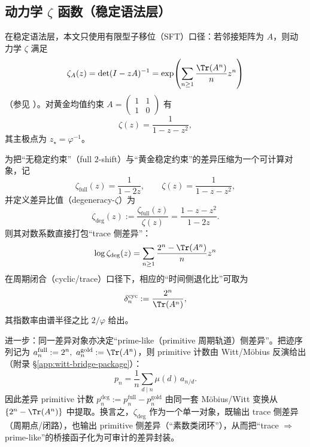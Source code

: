 \subsection{动力学 \texorpdfstring{$\zeta$}{zeta} 函数（稳定语法层）}

在稳定语法层，本文只使用有限型子移位（SFT）口径：若邻接矩阵为 $A$，则动力学 $\zeta$ 满足
\[
\zeta_A(z)=\det(I-zA)^{-1}
=\exp\!\left(\sum_{n\ge 1}\frac{\Tr(A^n)}{n}z^n\right)
\]
（参见 \cite{LindMarcus1995}）。对黄金均值约束
\(
A=\begin{pmatrix}1&1\\1&0\end{pmatrix}
\)
有
\[
\zeta(z)=\frac{1}{1-z-z^2},
\]
其主极点为 $z_\star=\varphi^{-1}$。

\begin{remark}\label{rem:degeneracy-zeta-bridge}
为把“无稳定约束”（full $2$-shift）与“黄金稳定约束”的差异压缩为一个可计算对象，记
\[
\zeta_{\mathrm{full}}(z)=\frac{1}{1-2z},
\qquad
\zeta(z)=\frac{1}{1-z-z^2},
\]
并定义差异比值（degeneracy-$\zeta$）为
\[
\zeta_{\mathrm{deg}}(z):=\frac{\zeta_{\mathrm{full}}(z)}{\zeta(z)}
=\frac{1-z-z^2}{1-2z}.
\]
则其对数系数直接打包“trace 侧差异”：
\[
\log \zeta_{\mathrm{deg}}(z)
=\sum_{n\ge 1}\frac{2^n-\Tr(A^n)}{n}z^n
\]
在周期闭合（cyclic/trace）口径下，相应的“时间侧退化比”可取为
\[
\delta_n^{\mathrm{cyc}}:=\frac{2^n}{\Tr(A^n)},
\]
其指数率由谱半径之比 \(2/\varphi\) 给出。

进一步：同一差异对象亦决定“prime-like（primitive 周期轨道）侧差异”。把迹序列记为
\(
a_n^{\mathrm{full}}:=2^n,\ a_n^{\mathrm{gold}}:=\Tr(A^n)
\)，则 primitive 计数由 Witt/Möbius 反演给出（附录 \S\ref{app:witt-bridge-package}）：
\[
p_n=\frac{1}{n}\sum_{d\mid n}\mu(d)\,a_{n/d}.
\]
因此差异 primitive 计数
\(
p_n^{\mathrm{deg}}:=p_n^{\mathrm{full}}-p_n^{\mathrm{gold}}
\)
由同一套 Möbius/Witt 变换从 \(\{2^n-\Tr(A^n)\}\) 中提取。换言之，\(\zeta_{\mathrm{deg}}\) 作为一个单一对象，既输出 trace 侧差异（周期点/闭路），也输出 primitive 侧差异（“素数类闭环”），从而把“trace \(\Rightarrow\) prime-like”的桥接函子化为可审计的差异封装。
\end{remark}

